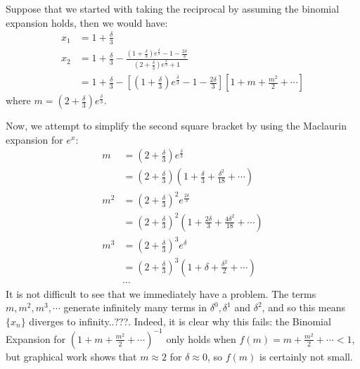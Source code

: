 \documentclass[../jarvis.tex]{subfiles}
\begin{document}
Suppose that we started with taking the reciprocal by assuming the binomial expansion holds, then we would have:
\begin{align*}
    x_1 &= 1+\frac{\delta}{3}\\
    x_2 &= 1+\frac{\delta}{3}-\frac{\left(1+\frac{\delta}{3}\right)e^{\frac{\delta}{3}}-1-\frac{2\delta}{3}}{\left(2+\frac{\delta}{3}\right)e^\frac{\delta}{3}+1} \\
    &= 1+\frac{\delta}{3}-\left[\left(1+\frac{\delta}{3}\right)e^{\frac{\delta}{3}}-1-\frac{2\delta}{3}\right]\left[1+m+\frac{m^2}{2}+\cdots\right]
\end{align*}
where $m=\left(2+\frac{\delta}{3}\right)e^\frac{\delta}{3}$.

Now, we attempt to simplify the second square bracket by using the Maclaurin expansion for $e^x:$
\begin{align*}
    m &= \left(2+\frac{\delta}{3}\right)e^\frac{\delta}{3} \\ &= \left(2+\frac{\delta}{3}\right)\left(1+\frac{\delta}{3}+\frac{\delta^2}{18}+\cdots\right) \\
    m^2 &= \left(2+\frac{\delta}{3}\right)^2e^\frac{2\delta}{3} \\ &= \left(2+\frac{\delta}{3}\right)^2\left(1+\frac{2\delta}{3}+\frac{4\delta^2}{18}+\cdots\right) \\
    m^3 &= \left(2+\frac{\delta}{3}\right)^3e^\delta \\ &= \left(2+\frac{\delta}{3}\right)^3\left(1+\delta+\frac{\delta^2}{2}+\cdots\right)\\
    &\cdots
\end{align*}
It is not difficult to see that we immediately have a problem. The terms $m, m^2, m^3, \cdots$ generate infinitely many terms in $\delta^0, \delta^1$ and $\delta^2$, and so this means $\{x_n\}$ diverges to infinity..???. Indeed, it is clear why this fails: the Binomial Expansion for $(1+m+\frac{m^2}{2}+\cdots)^{-1}$ only holds when $f(m)=m+\frac{m^2}{2}+\cdots < 1$, but graphical work shows that $m\approx 2$ for $\delta \approx 0$, so $f(m)$ is certainly not small. 
\end{document}
